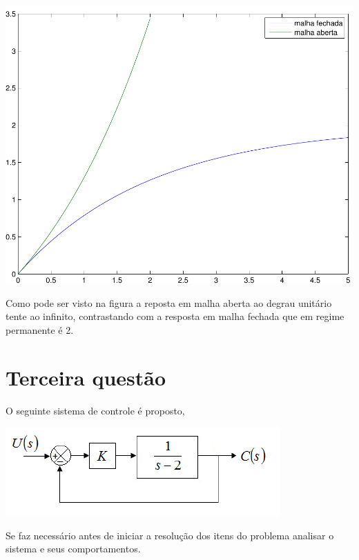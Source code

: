 \documentclass[paper=a4, fontsize=11pt]{article}
\begin{document}
\begin{center}
    \includegraphics[scale=.5]{q2ib.pdf}
\end{center}

Como pode ser visto na figura a reposta em malha aberta ao degrau unitário 
tente ao infinito, contrastando com a resposta em malha fechada que em 
regime permanente é 2.


\section{Terceira questão}

O seguinte sistema de controle é proposto,

\begin{center}
    \includegraphics[scale=0.5]{q3.png}
\end{center}

Se faz necessário antes de iniciar a resolução dos itens do problema analisar o
sistema e seus comportamentos.
\end{document}

